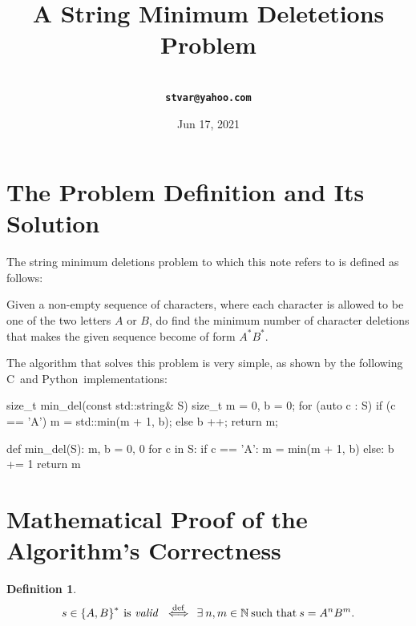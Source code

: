 \documentclass[a4paper,9pt,leqno]{article}
\title{A String Minimum Deletetions Problem}
\author{\larger\vargyas\medskip\\ \tt\textbf{stvar@yahoo.com}}
\date{Jun 17, 2021}
\renewcommand{\=}{\protect\nobreakdash-\hspace{0pt}}
\renewcommand{\~}{\protect\nobreakdash--\hspace{0pt}}
\newcommand{\plusplus}{\textbf{\raisebox{1pt}{++}}}
\newcommand{\cplusplus}{C\plusplus}
\newcommand{\python}{Python}
\theoremstyle{plain}
\theoremstyle{definition}
\newtheorem{definition}[fact]{Definition}
\theoremstyle{remark}
\newcommand{\iffl}{\:\:\Longleftrightarrow\:\:}
\newcommand{\by}[1]{{#1}}
\newcommand{\bydef}{\by{def}}
\newcommand{\symby}[2]{\stackrel{#1}{{#2}}}
\newcommand{\symbyrm}[2]{\symby{{\rm\scriptstyle{#1}}}{#2}}
\newcommand{\iffby}[1]{\symbyrm{#1}{\iffl}}
\newcommand{\iffbydef}{\iffby{\bydef}}
\newcommand{\txt}[1]{\:\text{#1}\:}
\newcommand{\ms}{\:}
\newcommand{\lc}{\left\{}
\newcommand{\rc}{\right\}}
\newcommand\Nat{\mathbb{N}}
\newcommand\Nat*{\mathbb{N}^*}
\begin{document}
\maketitle
\tableofcontents

\section{The Problem Definition and Its Solution}

The string minimum deletions problem to which this note refers
to is defined as follows:

\begin{quoting}
Given a non-empty sequence of characters, where each character
is allowed to be one of the two letters $A$ or $B$, do find the
minimum number of character deletions that makes the given
sequence become of form $A^\ast\! B^\ast$.
\end{quoting}

The algorithm that solves this problem is very simple, as shown
by the following \cplusplus\ and \python\ implementations:

\medskip

\begin{cpplisting}
size_t min_del(const std::string& S)
{
    size_t m = 0, b = 0;
    for (auto c : S) {
        if (c == 'A')
            m = std::min(m + 1, b);
        else
            b ++;
    }
    return m;
}
\end{cpplisting}

\begin{pylisting}
def min_del(S):
    m, b = 0, 0
    for c in S:
        if c == 'A':
            m = min(m + 1, b)
        else:
            b += 1
    return m
\end{pylisting}

\break

\section{Mathematical Proof of the Algorithm's Correctness}

\begin{definition}
\begin{equation}
s\in\lc A, B\rc^\ast \txt{is {\it valid}} \iffbydef
\exists\ms n, m\in\Nat \txt{such that} s = A^n B^m. \label{defvalid}
\end{equation}
\end{definition}
\end{document}
